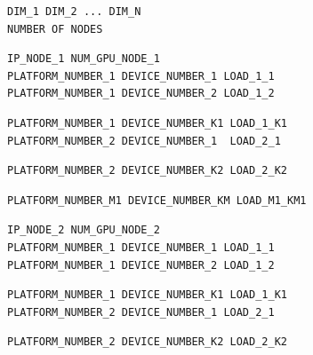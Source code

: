 \begin{mdframed}
\begin{mdframed}[hidealllines=true,backgroundcolor=blue!5]
	\begin{verbatim}
DIM_1 DIM_2 ... DIM_N
NUMBER OF NODES
	\end{verbatim}

\end{mdframed}
\begin{mdframed}[hidealllines=true,backgroundcolor=red!5]
	\begin{verbatim}
IP_NODE_1 NUM_GPU_NODE_1
PLATFORM_NUMBER_1 DEVICE_NUMBER_1 LOAD_1_1
PLATFORM_NUMBER_1 DEVICE_NUMBER_2 LOAD_1_2
	\end{verbatim}
	\begin{center}
	\scalebox{1.2}{$\hdots$}
	\end{center}
	\begin{verbatim}
PLATFORM_NUMBER_1 DEVICE_NUMBER_K1 LOAD_1_K1
PLATFORM_NUMBER_2 DEVICE_NUMBER_1  LOAD_2_1
	\end{verbatim}
	\begin{center}
	\scalebox{1.2}{$\hdots$}
	\end{center}
	\begin{verbatim}
PLATFORM_NUMBER_2 DEVICE_NUMBER_K2 LOAD_2_K2
	\end{verbatim}
	\begin{center}
	\scalebox{1.2}{$\hdots$}
	\end{center}
	\begin{verbatim}
PLATFORM_NUMBER_M1 DEVICE_NUMBER_KM LOAD_M1_KM1
	\end{verbatim}
\end{mdframed}
\begin{mdframed}[hidealllines=true,backgroundcolor=green!5]
	\begin{verbatim}
IP_NODE_2 NUM_GPU_NODE_2
PLATFORM_NUMBER_1 DEVICE_NUMBER_1 LOAD_1_1
PLATFORM_NUMBER_1 DEVICE_NUMBER_2 LOAD_1_2
	\end{verbatim}
	\begin{center}
	\scalebox{1.2}{$\hdots$}
	\end{center}
	\begin{verbatim}
PLATFORM_NUMBER_1 DEVICE_NUMBER_K1 LOAD_1_K1
PLATFORM_NUMBER_2 DEVICE_NUMBER_1 LOAD_2_1
	\end{verbatim}
	\begin{center}
	\scalebox{1.2}{$\hdots$}
	\end{center}
	\begin{verbatim}
PLATFORM_NUMBER_2 DEVICE_NUMBER_K2 LOAD_2_K2

\end{verbatim}
\end{mdframed}
\end{mdframed}
